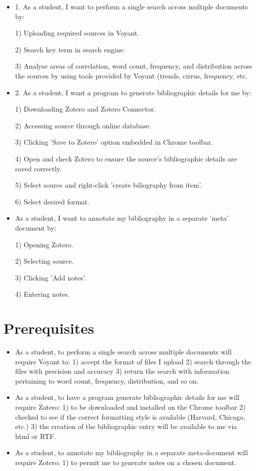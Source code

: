 \documentclass[a4paper,12pt]{article}
\begin{document}
\begin{itemize} 

\item{1. As a student, I want to perform a single search across multiple documents by: 


1) Uploading required sources in Voyant.


2) Search key term in search engine.


3) Analyse areas of correlation, word count, frequency, and distribution across the sources by using tools provided by Voyant (trends, cirrus, frequency, etc. }


\item {2. As a student, I want a program to generate bibliographic details for me by:


1) Downloading Zotero and Zotero Connector.


2) Accessing source through online database.


3) Clicking 'Save to Zotero' option embedded in Chrome toolbar.


4) Open and check Zotero to ensure the source's bibliographic details are saved correctly.

5) Select source and right-click 'create biliography from item'.

6) Select desired format.}

\item{As a student, I want to annotate my bibliography in a separate 'meta' document by:

1) Opening Zotero. 

2) Selecting source.

3) Clicking 'Add notes'.

4) Entering notes.}

\end{itemize}

\section{Prerequisites}


\begin{itemize}
   
   
\item As a student, to perform a single search across multiple documents will require Voyant to: 1) accept the format of files I upload 2) search through the files with precision and accuracy 3) return the search with information pertaining to word count, frequency, distribution, and so on. 


\item As a student, to have a program generate bibliographic details for me will require Zotero: 1) to be downloaded and installed on the Chrome toolbar 2) checked to see if the correct formatting style is available (Harvard, Chicago, etc.) 3) the creation of the bibliographic entry will be available to me via html or RTF. 
    
    
\item As a student, to annotate my bibliography in a separate meta-document will require Zotero: 1) to permit me to generate notes on a chosen document. 

\end{itemize}
\end{document}
